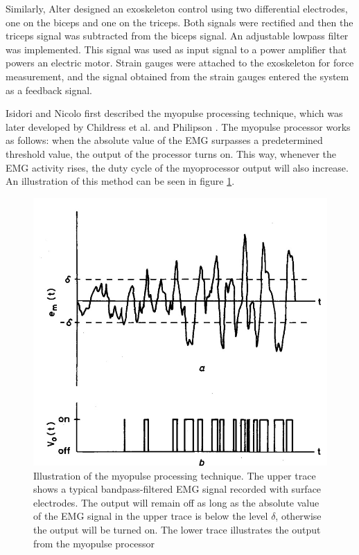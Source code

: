     Similarly, Alter \cite{alter1966bioelectric} designed an exoskeleton control using two differential electrodes, one on the biceps and one on the triceps. Both signals were rectified and then the triceps signal was subtracted from the biceps signal. An adjustable lowpass filter was implemented. This signal was used as input signal to a power amplifier that powers an electric motor. Strain gauges were attached to the exoskeleton for force measurement, and the signal obtained from the strain gauges entered the system as a feedback signal. 
    
    Isidori and Nicolo \cite{Isidori1966} first described the myopulse processing technique, which was later developed by Childress et al. \cite{childress1971} and Philipson \cite{Philipson1985}. The myopulse processor works as follows: when the absolute value of the EMG surpasses a predetermined threshold value, the output of the processor turns on. This way, whenever the EMG activity rises, the duty cycle of the myoprocessor output will also increase. An illustration of this method can be seen in figure \ref{Myopulse Processor}.
    
    \begin{figure}[t]
      \centering
      \includegraphics[scale=0.5]{Images/Myopulse.jpg}
      \caption{Illustration of the myopulse processing technique. The upper trace shows a typical bandpass-filtered EMG signal recorded with surface electrodes. The output will remain off as long as the absolute value of the EMG signal in the upper trace is below the level $\delta$, otherwise the output will be turned on. The lower trace illustrates the output from the myopulse processor \cite{Philipson1985}}
      \label{Myopulse Processor}
   \end{figure}
   
